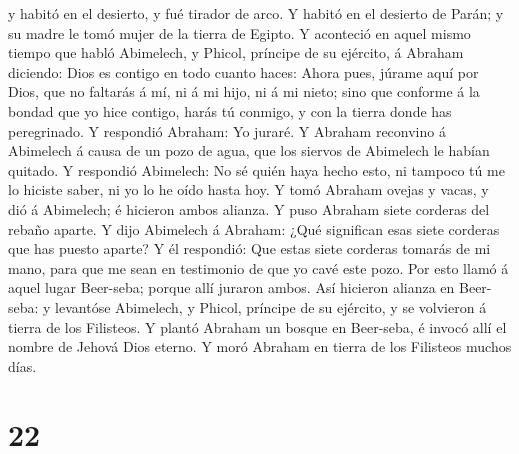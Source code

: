 y habitó en el desierto, y fué tirador de arco.  Y habitó
en el desierto de Parán; y su madre le tomó mujer de la tierra de
Egipto.  Y aconteció en aquel mismo tiempo que habló
Abimelech, y Phicol, príncipe de su ejército, á Abraham diciendo: Dios
es contigo en todo cuanto haces:  Ahora pues, júrame aquí
por Dios, que no faltarás á mí, ni á mi hijo, ni á mi nieto; sino que
conforme á la bondad que yo hice contigo, harás tú conmigo, y con la
tierra donde has peregrinado.  Y respondió Abraham: Yo
juraré.  Y Abraham reconvino á Abimelech á causa de un
pozo de agua, que los siervos de Abimelech le habían quitado.
 Y respondió Abimelech: No sé quién haya hecho esto, ni
tampoco tú me lo hiciste saber, ni yo lo he oído hasta hoy.
 Y tomó Abraham ovejas y vacas, y dió á Abimelech; é
hicieron ambos alianza.  Y puso Abraham siete corderas
del rebaño aparte.  Y dijo Abimelech á Abraham: ¿Qué
significan esas siete corderas que has puesto aparte?  Y
él respondió: Que estas siete corderas tomarás de mi mano, para que me
sean en testimonio de que yo cavé este pozo.  Por esto
llamó á aquel lugar Beer-seba; porque allí juraron ambos.
 Así hicieron alianza en Beer-seba: y levantóse
Abimelech, y Phicol, príncipe de su ejército, y se volvieron á tierra de
los Filisteos.  Y plantó Abraham un bosque en Beer-seba,
é invocó allí el nombre de Jehová Dios eterno.  Y moró
Abraham en tierra de los Filisteos muchos días.

\hypertarget{section-21}{%
\section{22}\label{section-21}}


